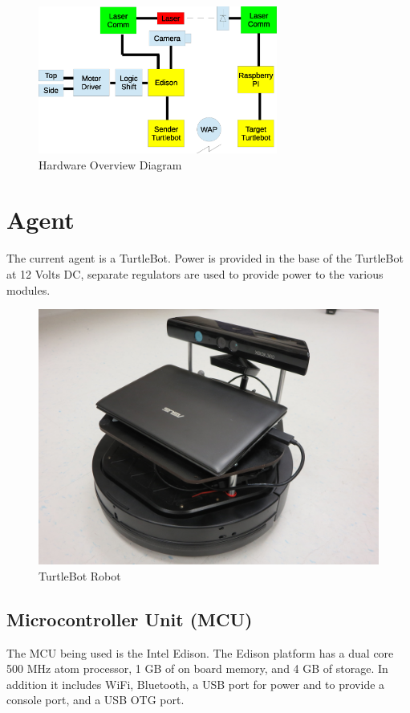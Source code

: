 \documentclass[botnum, fleqn]{unmeethesis}
\begin{document}
\begin{figure}[ht]
 \begin{center}
  \includegraphics[width=0.7\textwidth]{figures/SystemDiagram.eps}
  \caption{\small \label{fig:system_diagram} Hardware Overview Diagram}
 \end{center}
\end{figure}

\section*{Agent}
The current agent is a TurtleBot. Power is provided in the base of the TurtleBot at 12 Volts DC, separate regulators are used to provide power to the various modules. 

\begin{figure}[ht]
 \begin{center}
  \includegraphics[width=0.5 \textwidth]{figures/TurtleBot.JPG}
  \caption{\small \label{fig:turtlebot} TurtleBot Robot}
 \end{center}
\end{figure}


\subsection*{Microcontroller Unit (MCU)}
The MCU being used is the Intel Edison. The Edison platform has a dual core 500 MHz atom processor, 1 GB of on board memory, and 4 GB of storage. In addition it includes WiFi, Bluetooth, a USB port for power and to provide a console port, and a USB OTG port. 
\end{document}
